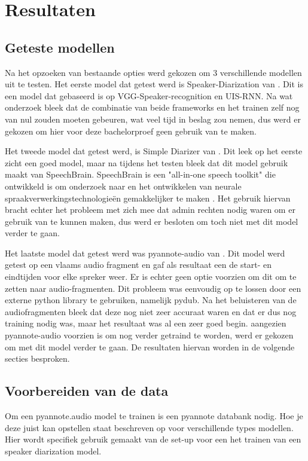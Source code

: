 
\chapter{Resultaten}%
\label{ch:resultaten}

\section{Geteste modellen}
\label{sec:modellen}
Na het opzoeken van bestaande opties werd gekozen om 3 verschillende modellen uit te testen. Het eerste model dat getest werd is Speaker-Diarization van \textcite{DongLu}. Dit is een model dat gebaseerd is op VGG-Speaker-recognition en UIS-RNN. Na wat onderzoek bleek dat de combinatie van beide frameworks en het trainen zelf nog van nul zouden moeten gebeuren, wat veel tijd in beslag zou nemen, dus werd er gekozen om hier voor deze bachelorproef geen gebruik van te maken.

Het tweede model dat getest werd, is Simple Diarizer van \textcite{Chau}. Dit leek op het eerste zicht een goed model, maar na tijdens het testen bleek dat dit model gebruik maakt van SpeechBrain. SpeechBrain is een "all-in-one speech toolkit" die ontwikkeld is om onderzoek naar en het ontwikkelen van neurale spraakverwerkingstechnologieën gemakkelijker te maken \autocite{speechbrain}. Het gebruik hiervan bracht echter het probleem met zich mee dat admin rechten nodig waren om er gebruik van te kunnen maken, dus werd er besloten om toch niet met dit model verder te gaan.

Het laatste model dat getest werd was pyannote-audio van \textcite{Bredin2024}. Dit model werd getest op een vlaams audio fragment en gaf als resultaat een de start- en eindtijden voor elke spreker weer. Er is echter geen optie voorzien om dit om te zetten naar audio-fragmenten. Dit probleem was eenvoudig op te lossen door een externe python library te gebruiken, namelijk pydub. Na het beluisteren van de audiofragmenten bleek dat deze nog niet zeer accuraat waren en dat er dus nog training nodig was, maar het resultaat was al een zeer goed begin. aangezien pyannote-audio voorzien is om nog verder getraind te worden, werd er gekozen om met dit model verder te gaan. De resultaten hiervan worden in de volgende secties besproken.

\section{Voorbereiden van de data}
\label{sec:data}
Om een pyannote.audio model te trainen is een pyannote databank nodig. Hoe je deze juist kan opstellen staat beschreven op \textcite{Bredindatabank} voor verschillende types modellen. Hier wordt specifiek gebruik gemaakt van de set-up voor een het trainen van een speaker diarization model.


